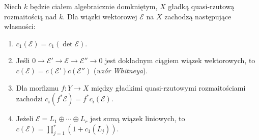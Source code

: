 \begin{twierdzenie}
\label{tw:ga7-chern-axioms}
Niech $k$ będzie ciałem algebraicznie domkniętym,
$X$ gładką quasi-rzutową rozmaitością nad $k$.
Dla wiązki wektorowej $\mathcal E$ na $X$
zachodzą następujące własności:
\begin{enumerate}[label=(\roman*)]
\item $c_1(\mathcal E)=c_1(\det\mathcal E)$.
\item Jeśli $0\to\mathcal E'\to\mathcal E\to\mathcal E''\to0$
      jest dokładnym ciągiem wiązek wektorowych, to
      $c(\mathcal E)=c(\mathcal E')c(\mathcal E'')$
      (\emph{wzór Whitneya}).
\item Dla morfizmu $f:Y\to X$ między gładkimi
      quasi-rzutowymi rozmaitościami zachodzi
      $c_i(f^*\mathcal E)=f^*c_i(\mathcal E)$.
\item Jeżeli $\mathcal E=L_1\oplus\cdots\oplus L_r$
      jest sumą wiązek liniowych, to
      $c(\mathcal E)=\prod_{j=1}^r(1+c_1(L_j))$.
\end{enumerate}
\end{twierdzenie}

